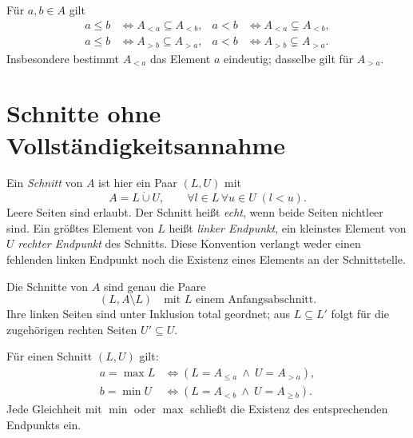 \begin{theorem}
\label{b15guide:thm:rays}
Für $a,b\in A$ gilt
\[
\begin{aligned}
 a\leq b&\Longleftrightarrow A_{<a}\subseteq A_{<b},&
 a<b&\Longleftrightarrow A_{<a}\subsetneq A_{<b},\\
 a\leq b&\Longleftrightarrow A_{>b}\subseteq A_{>a},&
 a<b&\Longleftrightarrow A_{>b}\subsetneq A_{>a}.
\end{aligned}
\]
Insbesondere bestimmt $A_{<a}$ das Element $a$ eindeutig;
dasselbe gilt für $A_{>a}$.
\end{theorem}

\section{Schnitte ohne Vollständigkeitsannahme}

\begin{definition}
\label{b15guide:def:cut}
Ein \emph{Schnitt} von $A$ ist hier ein Paar $(L,U)$ mit
\[
 A=L\mathbin{\dot\cup}U,\qquad
 \forall l\in L\,\forall u\in U\;(l<u).
\]
Leere Seiten sind erlaubt. Der Schnitt heißt \emph{echt},
wenn beide Seiten nichtleer sind.
Ein größtes Element von $L$ heißt \emph{linker Endpunkt},
ein kleinstes Element von $U$ \emph{rechter Endpunkt} des Schnitts.
Diese Konvention verlangt weder einen fehlenden linken Endpunkt
noch die Existenz eines Elements an der Schnittstelle.
\end{definition}

\begin{theorem}
\label{b15guide:thm:cut-initial}
Die Schnitte von $A$ sind genau die Paare
\[
 (L,A\setminus L)
 \quad\text{mit }L\text{ einem Anfangsabschnitt}.
\]
Ihre linken Seiten sind unter Inklusion total geordnet;
aus $L\subseteq L'$ folgt für die zugehörigen rechten Seiten
$U'\subseteq U$.
\end{theorem}

\begin{theorem}
\label{b15guide:thm:cut-endpoint}
Für einen Schnitt $(L,U)$ gilt:
\[
\begin{aligned}
 a=\max L&\Longleftrightarrow
          (L=A_{\leq a}\ \land\ U=A_{>a}),\\
 b=\min U&\Longleftrightarrow
          (L=A_{<b}\ \land\ U=A_{\geq b}).
\end{aligned}
\]
Jede Gleichheit mit $\min$ oder $\max$ schließt die Existenz
des entsprechenden Endpunkts ein.
\end{theorem}

